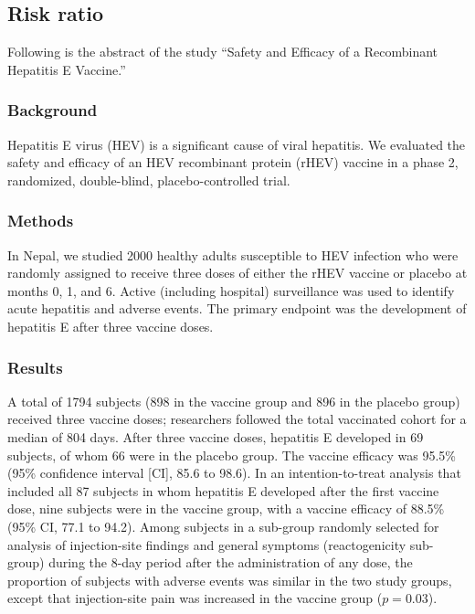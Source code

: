 \documentclass[11pt]{book}\usepackage[]{graphicx}\usepackage[]{color}
\begin{document}
\subsection{Risk ratio}

Following is the abstract of the study ``Safety and Efficacy of a Recombinant Hepatitis E Vaccine.''  %

\subsubsection{Background}

Hepatitis E virus (HEV) is a significant cause of viral hepatitis.  We evaluated
the safety and efficacy of an HEV recombinant protein (rHEV) vaccine in a phase
2, randomized, double-blind, placebo-controlled trial.

\subsubsection{Methods}

In Nepal, we studied 2000 healthy adults susceptible to HEV infection who were randomly assigned to receive three doses of either the rHEV vaccine or placebo at months 0, 1, and 6. Active (including hospital) surveillance was used to identify acute hepatitis and adverse events. The primary endpoint was the development of hepatitis E after three vaccine doses.

\subsubsection{Results}

A total of 1794 subjects (898 in the vaccine group and 896 in the placebo group) received three vaccine doses; researchers followed the total vaccinated cohort for a median of 804 days.  After three vaccine doses, hepatitis E developed in 69 subjects, of whom 66 were in the placebo group.  The vaccine efficacy was 95.5\% (95\% confidence interval [CI], 85.6 to 98.6).  In an intention-to-treat analysis that included all 87 subjects in whom hepatitis E developed after the first vaccine dose, nine subjects were in the vaccine group, with a vaccine efficacy of 88.5\% (95\% CI, 77.1 to 94.2).  Among subjects in a sub-group randomly selected for analysis of injection-site findings and general symptoms (reactogenicity sub-group) during the 8-day period after the administration of any dose, the proportion of subjects with adverse events was similar in the two study groups, except that injection-site pain was increased in the vaccine group ($p = 0.03$).
\end{document}
